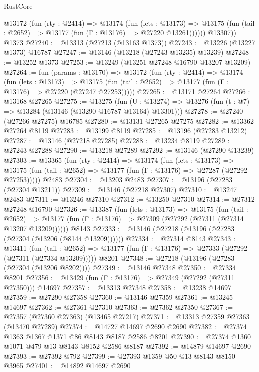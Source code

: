 \begin{lexlean}{RustCore}
\begin{coremodule}
          @13172
            (fun (rty : @2414) =>
            @13174
              (fun (lets : @13173) =>
              @13175 (fun (tail : @2652) => @13177 (fun (Γ : @13176) => @27220 @13261))))))
        @13307))
    @1373
@27240 := @13313 (@27213 (@13163 @1373))
@27243 := @13226 (@13227 @1373) @16787
@27247 := @13146 (@13218 (@27243 @13235) @13239)
@27248 := @13252 @1373
@27253 := @13249 (@13251 @27248 @16790 @13207 @13209)
@27264 := fun (params : @13170) =>
  @13172
    (fun (rty : @2414) =>
    @13174
      (fun (lets : @13173) =>
      @13175 (fun (tail : @2652) => @13177 (fun (Γ : @13176) => @27220 (@27247 @27253)))))
@27265 := @13171 @27264
@27266 := @13168 @27265
@27275 := @13275
    (fun (U : @13274) => @13276 (fun (t : @7) => @13284 (@13146 (@13290 @16787 @13164) @13301)))
@27278 := @27240 (@27266 @27275) @16785
@27280 := @13131 @27265 @27275
@27282 := @13362 @27264 @8119
@27283 := @13199 @8119
@27285 := @13196 (@27283 @13212)
@27287 := @13146 (@27218 @27285)
@27288 := @13234 @8119
@27289 := @27243 @27288
@27290 := @13218 @27289
@27292 := @13146 (@27290 @13239)
@27303 := @13365
    (fun (rty : @2414) =>
    @13174
      (fun (lets : @13173) =>
      @13175 (fun (tail : @2652) => @13177 (fun (Γ : @13176) => @27287 (@27292 @27253)))))
    @2483
@27304 := @13203 @2483
@27307 := @13196 (@27283 (@27304 @13211))
@27309 := @13146 (@27218 @27307)
@27310 := @13247 @2483
@27311 := @13246 @27310
@27312 := @13250 @27310
@27314 := @27312 @27248 @16790
@27326 := @13387
    (fun (lets : @13173) =>
    @13175
      (fun (tail : @2652) =>
      @13177 (fun (Γ : @13176) => @27309 (@27292 (@27311 (@27314 @13207 @13209))))))
    @8143
@27333 := @13146 (@27218 (@13196 (@27283 (@27304 (@13206 (@8144 @13209))))))
@27334 := @27314 @8143
@27343 := @13411
    (fun (tail : @2652) => @13177 (fun (Γ : @13176) => @27333 (@27292 (@27311 (@27334 @13209)))))
    @8201
@27348 := @27218 (@13196 (@27283 (@27304 (@13206 @8202))))
@27349 := @13146 @27348
@27350 := @27334 @8201
@27356 := @13429 (fun (Γ : @13176) => @27349 (@27292 (@27311 @27350))) @14697
@27357 := @13313 @27348
@27358 := @13238 @14697
@27359 := @27290 @27358
@27360 := @13146 @27359
@27361 := @13245 @14697
@27362 := @27361 @27310
@27363 := @27362 @27350
@27367 := @27357 (@27360 @27363) (@13465 @27217)
@27371 := @13313 @27359 @27363 (@13470 @27289)
@27374 := @14727 @14697 @2690 @2690
@27382 := @27374 @1363 @1367 @1371 @86 @8143 @8187 @2586 @8201
@27390 := @27374 @1360 @1071 @479 @13 @8143 @8152 @2586 @8187
@27392 := @14879 @14697 @2690
@27393 := @27392 @792
@27399 := @27393 @1359 @50 @13 @8143 @8150 @3965
@27401 := @14892 @14697 @2690

\end{coremodule}
\end{lexlean}
